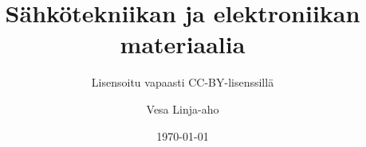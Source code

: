 \documentclass[]{beamer}
\begin{document}
\title{Sähkötekniikan ja elektroniikan materiaalia}
\subtitle{Lisensoitu vapaasti CC-BY-lisenssillä}
\author{Vesa Linja-aho}
\date{\today}
\frame{
\titlepage

}















































































%
\end{document}
